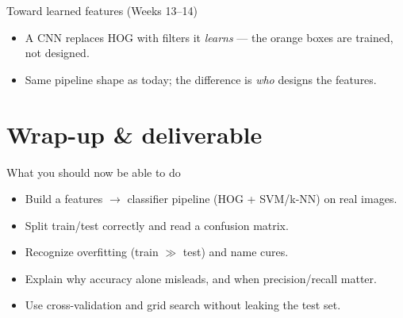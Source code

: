 \documentclass[10pt,aspectratio=169]{beamer}
\begin{document}
\begin{frame}{Toward learned features (Weeks 13--14)}
  \begin{center}
  \end{center}
  \begin{itemize}
    \item A CNN replaces HOG with filters it \emph{learns} — the orange boxes are trained, not designed.
    \item Same pipeline shape as today; the difference is \emph{who} designs the features.
  \end{itemize}
\end{frame}

\section{Wrap-up \& deliverable}

\begin{frame}{What you should now be able to do}
  \begin{itemize}
    \item Build a features $\rightarrow$ classifier pipeline (HOG + SVM/k-NN) on real images.
    \item Split train/test correctly and read a confusion matrix.
    \item Recognize overfitting (train $\gg$ test) and name cures.
    \item Explain why accuracy alone misleads, and when precision/recall matter.
    \item Use cross-validation and grid search without leaking the test set.
  \end{itemize}
\end{frame}
\end{document}
